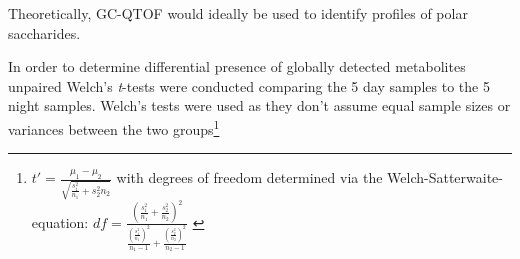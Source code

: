 Theoretically, GC-QTOF would ideally be used to identify profiles of polar
saccharides. 



%
%
%
%
%
%
%
%

%
%
%
%
%
%
%

%
%


In order to determine differential presence of globally detected metabolites
unpaired Welch's \textit{t}-tests were conducted comparing the 5 day samples to the 5
night samples. Welch's tests were used as they don't assume equal sample sizes or variances
between the two groups\citep{Welch1947}\footnote{
    \(t' = \frac{\mu_1 - \mu_2}{\sqrt{\frac{s^2_1}{n_1} + {s^2_2}{n_2}}}\)
    with degrees of freedom determined via the Welch-Satterwaite-equation:
    \(df = \frac{(\frac{s^2_1}{n_1} + \frac{s^2_2}{n_2})^2}{\frac{(\frac{s^2_1}{n_1})^2}{n_1 - 1} + \frac{(\frac{s^2_2}{n_2})^2}{n_2 - 1}}\)
    \citep{Ruxton2006}
}

